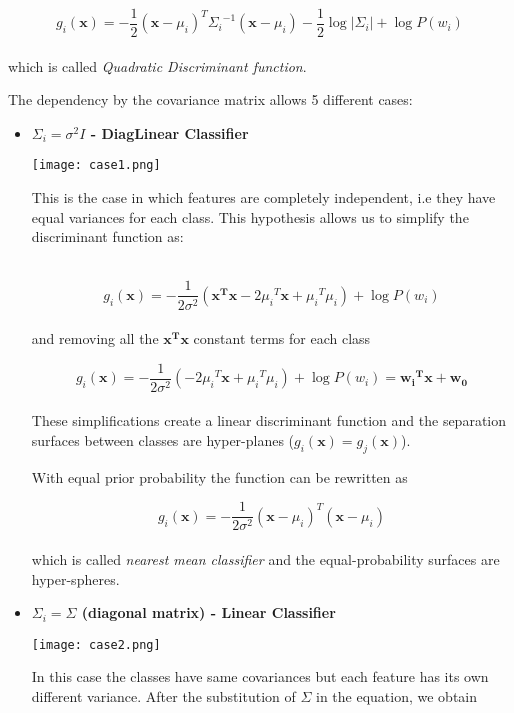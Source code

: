 \documentclass{standalone}
\begin{document}
$$
g_i(\mathbf{x}) = -\frac{1}{2}(\mathbf{x}-\mu_i)^T{\Sigma_i}^{-1}(\mathbf{x}-\mu_i) -\frac{1}{2}\log\left|\Sigma_i\right|+\log P(w_i)
$$
\\
which is called \emph{Quadratic Discriminant function}.

The dependency by the covariance matrix allows 5 different cases:

\begin{itemize}

\item \textbf{$\Sigma_i=\sigma^2I$ - DiagLinear Classifier}

\begin{minipage}{.30\textwidth}
\hspace{-.5cm}
\texttt{[image: case1.png]}
\end{minipage}%
\begin{minipage}{.70\textwidth}
This is the case in which features are completely independent, i.e they have equal variances for each class.
This hypothesis allows us to simplify the discriminant function as:
\end{minipage}\\

$$
g_i(\mathbf{x})=-\frac{1}{2\sigma^2}(\mathbf{x^Tx}-2{\mu_i}^T\mathbf{x} + {\mu_i}^T\mu_i) + \log P(w_i)
$$
\\
and removing all the $\mathbf{x^Tx}$ constant terms for each class

$$
g_i(\mathbf{x}) = -\frac{1}{2\sigma^2}(-2{\mu_i}^T\mathbf{x}+{\mu_i}^T\mu_i)+\log P(w_i) = \mathbf{{w_i}^Tx}+\mathbf{w_0}
$$
\\
These simplifications create a linear discriminant function and the separation surfaces between classes are hyper-planes ($g_i(\mathbf{x})=g_j(\mathbf{x})$).

With equal prior probability the function can be rewritten as

$$
g_i(\mathbf{x}) = -\frac{1}{2\sigma^2}(\mathbf{x}-\mu_i)^T(\mathbf{x}-\mu_i)
$$
\\
which is called \emph{nearest mean classifier} and the equal-probability surfaces are hyper-spheres.


\item \textbf{$\Sigma_i = \Sigma$ (diagonal matrix) - Linear Classifier}

\begin{minipage}{.30\textwidth}
\hspace{-.5cm}
\texttt{[image: case2.png]}
\end{minipage}%
\begin{minipage}{.70\textwidth}
In this case the classes have same covariances but each feature has its own different variance.
After the substitution of $\Sigma$ in the equation, we obtain
\end{minipage}\\


\end{itemize}
\end{document}
